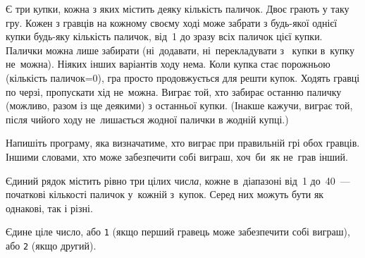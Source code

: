 ﻿Є три к{\it у}пки, кожна з яких містить деяку кількість паличок.
Двоє грають у таку гру.
Кожен з гравців на кожному своєму ході може забрати з будь-якої однієї купки будь-яку кількість паличок, від~1 до зразу всіх паличок цієї купки. Палички можна лише забирати (ні~додавати, ні~перекладувати з~ купки в~купку не~можна).
Ніяких інших варіантів ходу нема. 
Коли купка стає порожньою (кількість паличок=0), гра просто продовжується для решти купок.
Ходять гравці по черзі, пропускати хід не~можна.
Виграє той, хто забирає останню паличку (можливо, разом із ще деякими) з останньої купки.
(Інакше кажучи, виграє той, після чийого ходу не~лишається жодної палички в жодній купці.)

Напишіть програму, яка визначатиме, хто виграє при правильній грі обох гравців. 
Іншими словами, хто може забезпечити собі виграш, хоч~би~як не~грав інший.

\InputFile
Єдиний рядок містить рівно три цілих числ{\it а}, кожне в~діапазоні від~1 до~40~--- початкові кількості паличок у~кожній з~купок. Серед них можуть бути як однакові, так і різні.


\OutputFile
Єдине ціле число, або \texttt{1} (якщо перший гравець може забезпечити собі виграш), або \texttt{2} (якщо др{\it у}гий).

\Examples
\begin{example}
%
%
%
\end{example}

